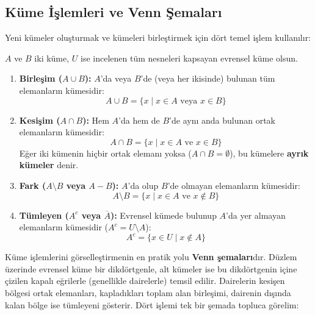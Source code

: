 \subsection{Küme İşlemleri ve Venn Şemaları}

Yeni kümeler oluşturmak ve kümeleri birleştirmek için dört temel işlem kullanılır:

\begin{definition}
$A$ ve $B$ iki küme, $U$ ise incelenen tüm nesneleri kapsayan evrensel küme olsun.
\begin{enumerate}
  \item \textbf{Birleşim ($A \cup B$):} $A$'da veya $B$'de (veya her ikisinde) bulunan tüm elemanların kümesidir:
  \[ A \cup B = \{x \mid x \in A \text{ veya } x \in B\} \]
  \item \textbf{Kesişim ($A \cap B$):} Hem $A$'da hem de $B$'de aynı anda bulunan ortak elemanların kümesidir:
  \[ A \cap B = \{x \mid x \in A \text{ ve } x \in B\} \]
  Eğer iki kümenin hiçbir ortak elemanı yoksa ($A \cap B = \emptyset$), bu kümelere \textbf{ayrık kümeler} denir.
  \item \textbf{Fark ($A \setminus B$ veya $A - B$):} $A$'da olup $B$'de olmayan elemanların kümesidir:
  \[ A \setminus B = \{x \mid x \in A \text{ ve } x \notin B\} \]
  \item \textbf{Tümleyen ($A^c$ veya $\overline{A}$):} Evrensel kümede bulunup $A$'da yer almayan elemanların kümesidir ($A^c = U \setminus A$):
  \[ A^c = \{x \in U \mid x \notin A\} \]
\end{enumerate}
\end{definition}

Küme işlemlerini görselleştirmenin en pratik yolu \textbf{Venn şemaları}dır. Düzlem üzerinde evrensel küme bir dikdörtgenle, alt kümeler ise bu dikdörtgenin içine çizilen kapalı eğrilerle (genellikle dairelerle) temsil edilir. Dairelerin kesişen bölgesi ortak elemanları, kapladıkları toplam alan birleşimi, dairenin dışında kalan bölge ise tümleyeni gösterir. Dört işlemi tek bir şemada topluca görelim:

